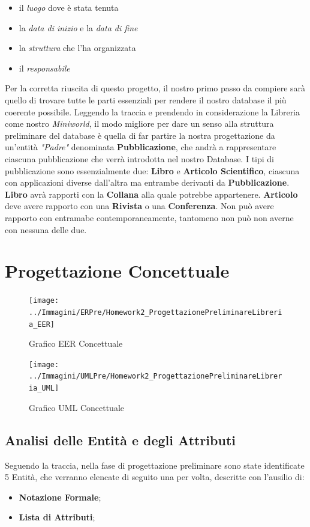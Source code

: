 \documentclass[a4paper, 15pt, oneside]{article}
\begin{document}
	\begin{itemize}
		\item il \textit{luogo} dove è stata tenuta
		\item la \textit{data di inizio} e la \textit{data di fine}
		\item la \textit{struttura} che l’ha organizzata
		\item il \textit{responsabile}
	\end{itemize}
	Per la corretta riuscita di questo progetto, il nostro primo passo da compiere sarà quello di trovare tutte le parti essenziali per rendere il nostro database il più coerente possibile.
	Leggendo la traccia e prendendo in considerazione la Libreria come nostro \emph{Miniworld}, il modo migliore per dare un senso alla struttura preliminare del database è quella di far partire la nostra progettazione da un'entità \textit{"Padre"} denominata \textbf{Pubblicazione}, che andrà a rappresentare ciascuna pubblicazione che verrà introdotta nel nostro Database. I tipi di pubblicazione sono essenzialmente due: \textbf{Libro} e \textbf{Articolo Scientifico}, ciascuna con applicazioni diverse dall'altra ma entrambe derivanti da \textbf{Pubblicazione}. \textbf{Libro} avrà rapporti con la \textbf{Collana} alla quale potrebbe appartenere. \textbf{Articolo} deve avere rapporto con una \textbf{Rivista} o una \textbf{Conferenza}. Non può avere rapporto con entramabe contemporaneamente, tantomeno non può non averne con nessuna delle due.
	\newpage
	\section{Progettazione Concettuale}
	\begin{figure}[H]
		\centering
		\texttt{[image: ../Immagini/ERPre/Homework2\_ProgettazionePreliminareLibreria\_EER]}
		\caption[Grafico ER]{Grafico EER Concettuale}
		\vspace*{0.5cm}
		\texttt{[image: ../Immagini/UMLPre/Homework2\_ProgettazionePreliminareLibreria\_UML]}
		\caption[Grafico UML]{Grafico UML Concettuale}
	\end{figure}
	\subsection{Analisi delle Entità e degli Attributi}
	Seguendo la traccia, nella fase di progettazione preliminare sono state identificate 5 Entità, che verranno elencate di seguito una per volta, descritte con l'ausilio di:
	\begin{itemize}
		\item \textbf{Notazione Formale};
		\item \textbf{Lista di Attributi};
	\end{itemize}
\end{document}
